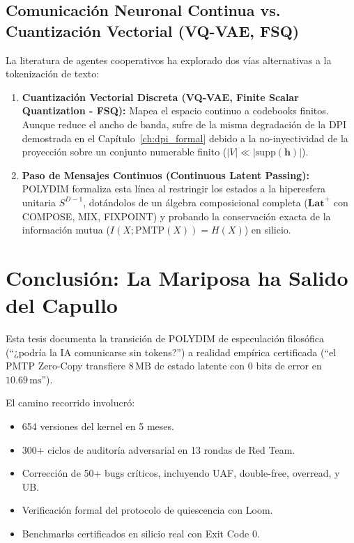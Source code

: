 \subsection{Comunicación Neuronal Continua vs. Cuantización Vectorial (VQ-VAE, FSQ)}
La literatura de agentes cooperativos ha explorado dos vías alternativas a la tokenización de texto:
\begin{enumerate}
    \item \textbf{Cuantización Vectorial Discreta (VQ-VAE, Finite Scalar Quantization - FSQ):} 
    Mapea el espacio continuo a codebooks finitos. Aunque reduce el ancho de banda, sufre de la 
    misma degradación de la DPI demostrada en el Capítulo~\ref{ch:dpi_formal} debido a la no-inyectividad 
    de la proyección sobre un conjunto numerable finito ($|V| \ll |\text{supp}(\mathbf{h})|$).
    \item \textbf{Paso de Mensajes Continuos (Continuous Latent Passing):} POLYDIM formaliza 
    esta línea al restringir los estados a la hiperesfera unitaria $S^{D-1}$, dotándolos de un 
    álgebra composicional completa ($\mathbf{Lat}^{+}$ con COMPOSE, MIX, FIXPOINT) y probando 
    la conservación exacta de la información mutua ($I(X; \text{PMTP}(X)) = H(X)$) en silicio.
\end{enumerate}

\section{Conclusión: La Mariposa ha Salido del Capullo}

Esta tesis documenta la transición de POLYDIM de especulación filosófica
(``¿podría la IA comunicarse sin tokens?'') a realidad empírica certificada
(``el PMTP Zero-Copy transfiere $8\,\text{MB}$ de estado latente con $0$ bits de error
en $10.69\,\text{ms}$'').

El camino recorrido involucró:
\begin{itemize}
\item 654 versiones del kernel en 5 meses.
\item 300+ ciclos de auditoría adversarial en 13 rondas de Red Team.
\item Corrección de 50+ bugs críticos, incluyendo UAF, double-free, overread, y UB.
\item Verificación formal del protocolo de quiescencia con Loom.
\item Benchmarks certificados en silicio real con Exit Code 0.
\end{itemize}

